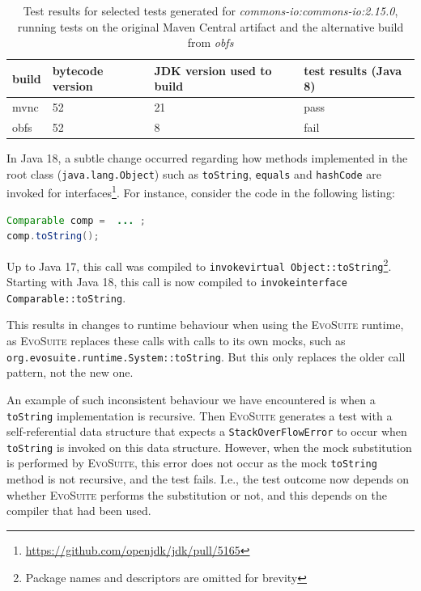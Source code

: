 \documentclass[conference]{IEEEtran}
\makeatletter
\newcommand{\evosuite}{\textsc{EvoSuite}\@\xspace}
\makeatother
\begin{document}
\begin{table}[h]
\caption{Test results for selected tests generated for  \textit{commons-io:commons-io:2.15.0}, running tests on the original Maven Central artifact and the alternative build from \textit{obfs}}
	\centering
	\begin{tabular}{p{1.2cm}p{1.2cm}p{1.7cm}p{1.3cm}}
		\toprule
		\textbf{build}         & \textbf{bytecode version} & \textbf{JDK version used to build} & \textbf{test results (Java 8)  }                                          \\ \midrule
		mvnc & 52       & 21                        & pass                                                                                        \\
		obfs         & 52               & 8                        & fail              \\ \bottomrule
	\end{tabular}
	
	\label{tab:stackoverflow}
\end{table}

In Java 18, a subtle change occurred regarding how methods implemented in the root class (\texttt{java.lang.Object}) such as \texttt{toString}, \texttt{equals} and \texttt{hashCode} are invoked for interfaces\footnote{\url{https://github.com/openjdk/jdk/pull/5165}}.
For instance, consider the code in the following listing:

\begin{lstlisting}[language=Java]
Comparable comp =  ... ; 
comp.toString();
\end{lstlisting}	

Up to Java 17, this call was compiled to \texttt{invokevirtual Object::toString}\footnote{Package names and descriptors are omitted for brevity}. Starting with Java 18, this call is now compiled to \texttt{invokeinterface Comparable::toString}.

This results in changes to runtime behaviour when using the \evosuite runtime, as \evosuite replaces these calls with calls to its own mocks, such as  \texttt{org.evosuite.runtime.System::toString}. But this only replaces the older call pattern, not the new one. 

An example of such inconsistent behaviour we have encountered  is when a \texttt{toString} implementation is recursive. Then \evosuite generates a test with a self-referential data structure that expects a \texttt{StackOverFlowError} to occur when \texttt{toString} is invoked on this data structure. However, when the mock substitution is performed by \evosuite, this error does not occur as the mock \texttt{toString} method is not recursive, and the test fails. I.e., the test outcome now depends on whether \evosuite performs the substitution or not, and this depends on the compiler that had been used.
\end{document}
